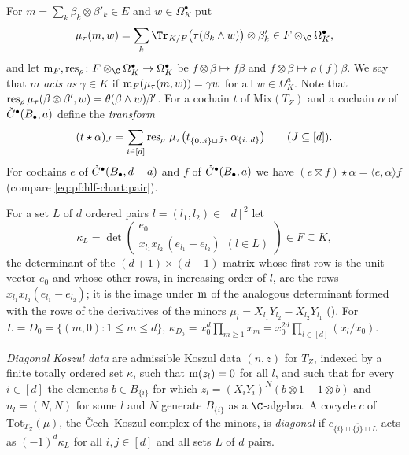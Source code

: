 For $m=\sum_k\beta_k\otimes\beta'_k\in E$ and $w\in\Omega^\bullet_K$ put
\[
  \mu_\tau(m,w)=\sum_k\Tr_{K/F}\bigl(\tau(\beta_k\wedge w)\bigr)\otimes\beta'_k\in F\otimes_\C\Omega^\bullet_K,
\]
and let $\hlfcmult_F,\hlfcres_\rho\colon F\otimes_\C\Omega^\bullet_K\to\Omega^\bullet_K$ be $f\otimes\beta\mapsto f\beta$ and $f\otimes\beta\mapsto\rho(f)\beta$. We say that
$m$ \emph{acts as} $\gamma\in K$ if $\operatorname{m}_F(\mu_\tau(m,w))=\gamma w$ for all $w\in\Omega^a_K$. Note that $\operatorname{res}_\rho\mu_\tau(\beta\otimes\beta',w)=\theta(\beta\wedge w)\beta'$.
For a cochain $t$ of $\mathrm{Mix}(T_Z)$ and a cochain $\alpha$ of $\check{C}^\bullet(B_\bullet,a)$ define the \emph{transform}
\begin{equation}\label{eq:pf:hlf-chart:transform}
  (t\star\alpha)_J=\sum_{i\in[d]}\operatorname{res}_\rho\,\mu_\tau\bigl(t_{\{0..i\}\sqcup\bar J},\,\alpha_{\{i..d\}}\bigr)\qquad(J\subseteq[d]).
\end{equation}
For cochains $e$ of $\check{C}^\bullet(B_\bullet,d-a)$ and $f$ of $\check{C}^\bullet(B_\bullet,a)$ we have $(e\boxtimes f)\star\alpha=\langle e,\alpha\rangle f$
(compare \eqref{eq:pf:hlf-chart:pair}).

For a set $L$ of $d$ ordered pairs $l=(l_1,l_2)\in[d]^2$ let
\[
  \kappa_L=\det\begin{pmatrix}e_0\\ x_{l_1}x_{l_2}\,(e_{l_1}-e_{l_2})\ \ (l\in L)\end{pmatrix}\in F\subseteq K,
\]
the determinant of the $(d+1)\times(d+1)$ matrix whose first row is the unit vector $e_0$ and whose other rows, in increasing order of $l$, are
the rows $x_{l_1}x_{l_2}(e_{l_1}-e_{l_2})$; it is the image under $\operatorname{m}$ of the analogous determinant formed with the rows of the derivatives of
the minors $\mu_l=X_{l_1}Y_{l_2}-X_{l_2}Y_{l_1}$ (). For $L=D_0=\{(m,0):1\le m\le d\}$,
$\kappa_{D_0}=x_0^d\prod_{m\ge1}x_m=x_0^{2d}\prod_{l\in[d]}(x_l/x_0)$.

\begin{definition}\label{pf:hlf-chart:def:zf}
\emph{Diagonal Koszul data} are admissible Koszul data $(n,z)$ for $T_Z$, indexed by a finite totally ordered set $\kappa$, such that
$\operatorname{m}(z_l)=0$ for all $l$, and such that for every $i\in[d]$ the elements $b\in B_{\{i\}}$ for which $z_l=(X_iY_i)^N(b\otimes1-1\otimes b)$ and
$n_l=(N,N)$ for some $l$ and $N$ generate $B_{\{i\}}$ as a $\C$-algebra. A cocycle $c$ of $\mathrm{Tot}_{T_Z}(\mu)$, the \v{C}ech--Koszul complex of
the minors, is \emph{diagonal} if $c_{\{i\}\sqcup\{\bar j\}\sqcup L}$ acts as $(-1)^d\kappa_L$ for all $i,j\in[d]$ and all sets $L$ of $d$ pairs.
\end{definition}

